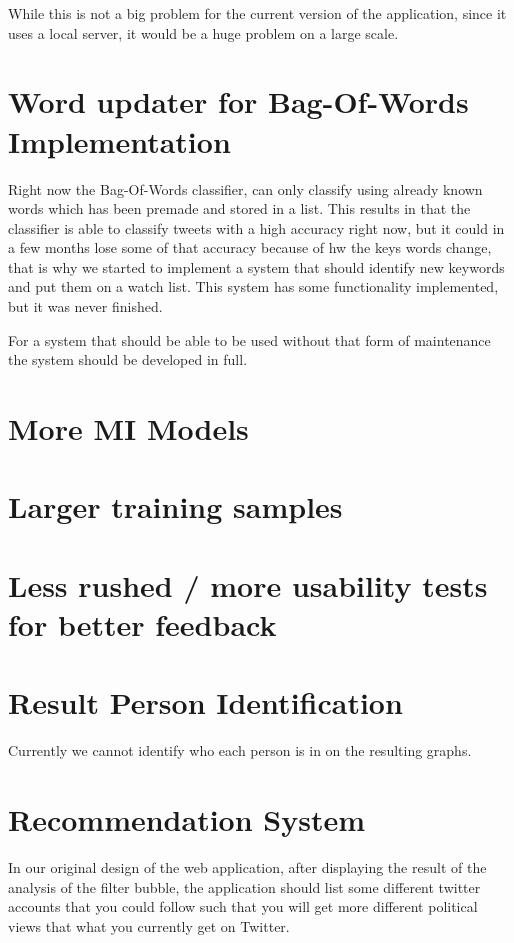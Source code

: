 While this is not a big problem for the current version of the application,
since it uses a local server, it would be a huge problem on a large scale. 

\section{Word updater for Bag-Of-Words Implementation}
Right now the Bag-Of-Words classifier, can only classify using already known
words which has been premade and stored in a list. This results in that the
classifier is able to classify tweets with a high accuracy right now, but it
could in a few months lose some of that accuracy because of hw the keys words 
change, that is why we started to implement a system that should identify new
keywords and put them on  a watch list. This system has some functionality
implemented, but it was never finished.

For a system that should be able to be used without that form of maintenance the
system should be developed in full.

\section{More MI  Models}

\section{Larger training samples}

\section{Less rushed / more usability tests for better feedback}

\section{Result Person Identification}
Currently we cannot identify who each person is in on the resulting graphs.

\section{Recommendation System}
In our original design of the web application, after displaying the result of
the analysis of the filter bubble, the application should list some different
twitter accounts that you could follow such that you will get more different
political views that what you currently get on Twitter. \nl

